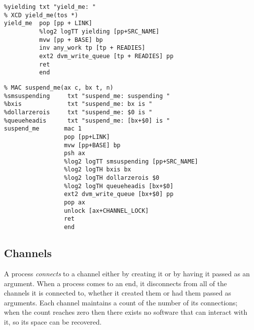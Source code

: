 \begin{tabbing}
\indents
{}
\fin
\end{tabbing}

{\small
\begin{verbatim}
%yielding txt "yield_me: "
% XCD yield_me(tos *)
yield_me  pop [pp + LINK]
          %log2 logTT yielding [pp+SRC_NAME]
          mvw [pp + BASE] bp
          inv any_work tp [tp + READIES]
          ext2 dvm_write_queue [tp + READIES] pp
          ret
          end
\end{verbatim}}

\begin{tabbing}
\indents
{}
\fin
\end{tabbing}

{\small
\begin{verbatim}
% MAC suspend_me(ax c, bx t, n)
%smsuspending     txt "suspend_me: suspending "
%bxis             txt "suspend_me: bx is "
%dollarzerois     txt "suspend_me: $0 is "
%queueheadis      txt "suspend_me: [bx+$0] is "
suspend_me       mac 1
                 pop [pp+LINK]
                 mvw [pp+BASE] bp
                 psh ax
                 %log2 logTT smsuspending [pp+SRC_NAME]
                 %log2 logTH bxis bx
                 %log2 logTH dollarzerois $0
                 %log2 logTH queueheadis [bx+$0]
                 ext2 dvm_write_queue [bx+$0] pp
                 pop ax
                 unlock [ax+CHANNEL_LOCK]
                 ret
                 end
\end{verbatim}}


\subsection{Channels}
A process \emph{connects} to a channel either by creating it or by having it passed as an argument. When a process comes to an end, it disconnects from all of the channels it is connected to, whether it created them or had them passed as arguments. Each channel maintains a count of the number of its connections; when the count reaches zero then there exists no software that can interact with it, so its space can be recovered.

